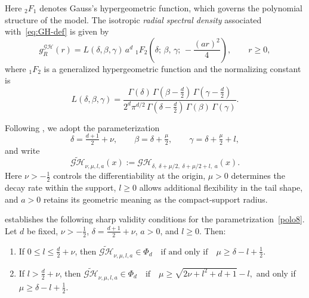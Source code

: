 \documentclass[
  12pt]{article}
\begin{document}
Here ${}_{2}F_{1}$ denotes Gauss's hypergeometric function, which governs the polynomial structure of the model.
The isotropic \emph{radial spectral density} associated with~\eqref{eq:GH-def} is given by
\begin{equation}\label{eq:GH-spectral}
g_{R}^{\mathcal{GH}}(r)
=
L(\delta,\beta,\gamma)
\,a^{d}\;
{}_{1}F_{2}\!\left(\delta;\,\beta,\,\gamma;\,-\frac{(ar)^2}{4}\right),
\qquad r\ge 0,
\end{equation}
where ${}_{1}F_{2}$ is a generalized hypergeometric function and the normalizing constant is
\[
L(\delta,\beta,\gamma)=
\frac{
\Gamma(\delta)\,\Gamma(\beta-\tfrac d2)\,\Gamma(\gamma-\tfrac d2)
}{
2^{d}\pi^{d/2}\,
\Gamma(\delta-\tfrac d2)\,
\Gamma(\beta)\,
\Gamma(\gamma)
}.
\]

Following \cite{hyp2025}, we adopt the parameterization
\begin{equation}\label{eq:GH-reparam}
\delta = \tfrac{d+1}{2} + \nu, \qquad
\beta = \delta + \tfrac{\mu}{2}, \qquad
\gamma = \delta + \tfrac{\mu}{2} + l,
\end{equation}
and write
\begin{equation}\label{polo8}
\widetilde{\mathcal{GH}}_{\nu,\mu,l,a}(x) :=
\mathcal{GH}_{\delta,\;\delta+\mu/2,\;\delta+\mu/2+l,\;a}(x).
\end{equation}
Here $\nu > -\tfrac{1}{2}$ controls the differentiability at the origin,
$\mu>0$ determines the decay rate within the support,
$l \ge 0$ allows additional flexibility in the tail shape,
and $a>0$ retains its geometric meaning as the compact-support radius.

\cite{hyp2025} establishes the following sharp validity conditions for the parametrization~\eqref{polo8}.
Let $d$ be fixed, $\nu > -\frac{1}{2}$, $\delta = \frac{d+1}{2}+\nu$, $a > 0$, and $l \ge 0$. Then:
\begin{enumerate}
\item If $0 \le l \le \frac{d}{2}+\nu$, then
$
\widetilde{\mathcal{GH}}_{\nu,\mu,l,a} \in \Phi_d
\quad\text{if and only if}\quad
\mu \ge \delta - l + \frac{1}{2}.
$

\item If $l > \frac{d}{2}+\nu$, then
$
\widetilde{\mathcal{GH}}_{\nu,\mu,l,a} \in \Phi_d
\quad\text{if}\quad
\mu \ge \sqrt{2\nu + l^2 + d + 1} - l,
$
and only if
$
\mu \ge \delta - l + \frac{1}{2}.
$
\end{enumerate}
\end{document}

